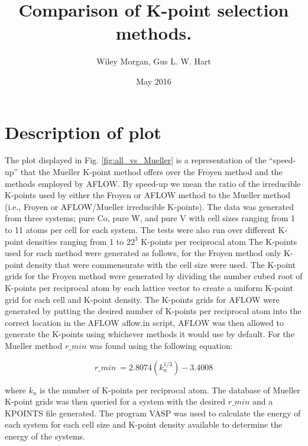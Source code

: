 \documentclass[12pt]{article}
\begin{document}
\title{Comparison of K-point selection methods.}

\author{Wiley Morgan, Gus L. W. Hart}


\date{May 2016}

\maketitle

\section*{Description of plot}

The plot displayed in Fig. \ref{fig:all_vs_Mueller} is a
representation of the ``speed-up'' that the Mueller K-point method
offers over the Froyen method and the methods employed by AFLOW. By
speed-up we mean the ratio of the irreducible K-points used by either
the Froyen or AFLOW method to the Mueller method (i.e., Froyen or
AFLOW/Mueller irreducible K-points). The data was generated from three
systems; pure Co, pure W, and pure V with cell sizes ranging from 1 to
11 atoms per cell for each system. The tests were also run over
different K-point densities ranging from 1 to $22^3$ K-points per
reciprocal atom The K-points used for each method were generated as
follows, for the Froyen method only K-point density that were
commensurate with the cell size were used. The K-point grids for the
Froyen method were generated by dividing the number cubed root of
K-points per reciprocal atom by each lattice vector to create a
uniform K-point grid for each cell and K-point density. The K-points
grids for AFLOW were generated by putting the desired number of
K-points per reciprocal atom into the correct location in the AFLOW
aflow.in script, AFLOW was then allowed to generate the K-points using
whichever methods it would use by default. For the Mueller method
$r\_min$ was found using the following equation:

\begin{equation}
  r\_min ~= 2.8074(k_n^{1/3})-3.4008
\end{equation}

where $k_n$ is the number of K-points per reciprocal atom. The
database of Mueller K-point grids was then queried for a system with
the desired $r\_min$ and a KPOINTS file generated. The program VASP
was used to calculate the energy of each system for each cell size and
K-point density available to determine the energy of the systems.
\end{document}
